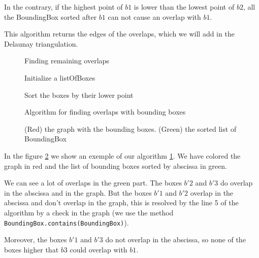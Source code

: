\documentclass[12pt]{report}
\begin{document}
In the contrary, if the highest point of $b1$ is lower than the lowest point of $b2$, all the BoundingBox sorted after $b1$ can not cause an overlap with $b1$.

\bigskip
This algorithm returns the edges of the overlaps, which we will add in the Delaunay triangulation.

\begin{figure}
\begin{algorithm}[H]
\caption{Finding remaining overlaps}
Initialize a listOfBoxes

Sort the boxes by their lower point

	{}
\end{algorithm}
\caption{Algorithm for finding overlaps with bounding boxes}
\label{algscanline}
\end{figure}

\begin{figure}[h]
  \center
  \setlength\fboxsep{5pt}
  \setlength\fboxrule{0.5pt}
  \caption{(Red) the graph with the bounding boxes. (Green) the sorted list of BoundingBox}
  \label{scanline}
\end{figure}

In the figure \ref{scanline} we show an exemple of our algorithm \ref{algscanline}. We have colored the graph in red and the list of bounding boxes sorted by abscissa in green. 

We can see a lot of overlaps in the green part. The boxes $b'2$ and $b'3$ do overlap in the abscissa and in the graph. But the boxes $b'1$ and $b'2$ overlap in the abscissa and don't overlap in the graph, this is resolved by the line 5 of the algorithm by a check in the graph (we use the method \texttt{BoundingBox.contains(BoundingBox)}).

Moreover, the boxes $b'1$ and $b'3$ do not overlap in the abscissa, so none of the boxes higher that $b3$ could overlap with $b1$.
\end{document}
